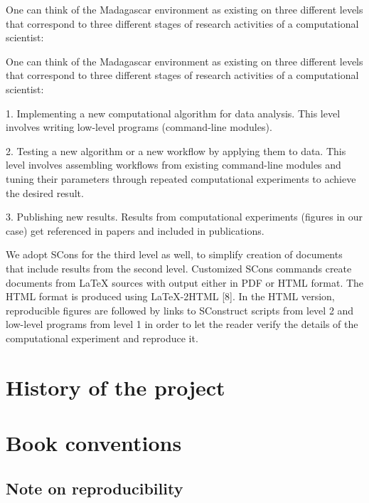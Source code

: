 One can think of the Madagascar environment as existing on three
different levels that correspond to three different stages of research
activities of a computational scientist:

One can think of the Madagascar environment as existing on three
different levels that correspond to three different stages of research
activities of a computational scientist:

1. Implementing a new computational algorithm for data analysis. This
level involves writing low-level programs (command-line modules).

2. Testing a new algorithm or a new workflow by applying them to
data. This level involves assembling workflows from existing
command-line modules and tuning their parameters through repeated
computational experiments to achieve the desired result.

3. Publishing new results. Results from computational experiments
(figures in our case) get referenced in papers and included in
publications.

We adopt SCons for the third level as well, to simplify creation of
documents that include results from the second level. Customized SCons
commands create documents from LaTeX sources with output either in PDF
or HTML format. The HTML format is produced using LaTeX-2HTML [8]. In
the HTML version, reproducible figures are followed by links to
SConstruct scripts from level 2 and low-level programs from level 1 in
order to let the reader verify the details of the computational
experiment and reproduce it.


\section{History of the project}

\section{Book conventions}

\subsection{Note on reproducibility}
